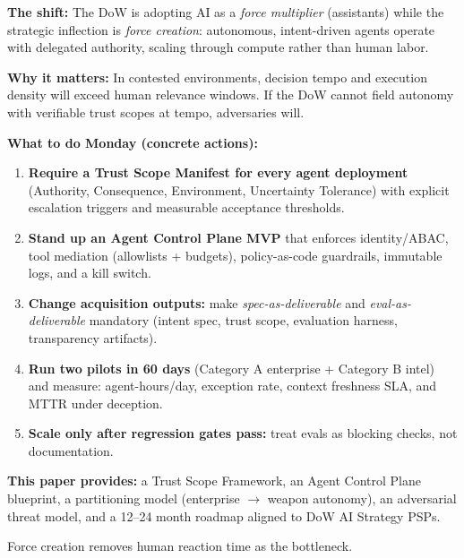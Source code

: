 \documentclass[11pt]{article}
\begin{document}
\makepapercover

{\small\renewcommand{\baselinestretch}{0.96}\selectfont\tableofcontents}
\newpage

\begin{execsummary}
\textbf{The shift:} The DoW is adopting AI as a \emph{force multiplier} (assistants) while the strategic inflection is \emph{force creation}: autonomous, intent-driven agents operate with delegated authority, scaling through compute rather than human labor.

\textbf{Why it matters:} In contested environments, decision tempo and execution density will exceed human relevance windows. If the DoW cannot field autonomy with verifiable trust scopes at tempo, adversaries will.

\textbf{What to do Monday (concrete actions):}
\begin{enumerate}
  \item \textbf{Require a Trust Scope Manifest for every agent deployment} (Authority, Consequence, Environment, Uncertainty Tolerance) with explicit escalation triggers and measurable acceptance thresholds.
  \item \textbf{Stand up an Agent Control Plane MVP} that enforces identity/ABAC, tool mediation (allowlists + budgets), policy-as-code guardrails, immutable logs, and a kill switch.
  \item \textbf{Change acquisition outputs:} make \emph{spec-as-deliverable} and \emph{eval-as-deliverable} mandatory (intent spec, trust scope, evaluation harness, transparency artifacts).
  \item \textbf{Run two pilots in 60 days} (Category A enterprise + Category B intel) and measure: agent-hours/day, exception rate, context freshness SLA, and MTTR under deception.
  \item \textbf{Scale only after regression gates pass:} treat evals as blocking checks, not documentation.
\end{enumerate}

\textbf{This paper provides:} a Trust Scope Framework, an Agent Control Plane blueprint, a partitioning model (enterprise $\rightarrow$ weapon autonomy), an adversarial threat model, and a 12--24 month roadmap aligned to DoW AI Strategy PSPs.

\vspace{0.3\baselineskip}
\begin{calloutquote}
Force creation removes human reaction time as the bottleneck.
\end{calloutquote}
\end{execsummary}
\end{document}
